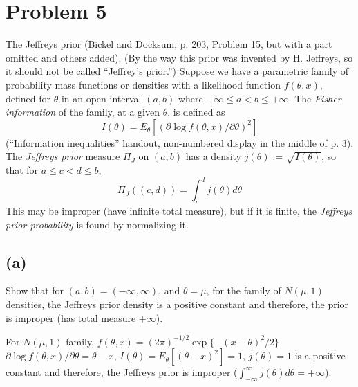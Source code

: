 \documentclass[11pt]{article}
\newcommand{\ProbS}{\iftrue}
\newcommand{\ProbE}{\fi}
\begin{document}
\section{Problem 5}
\ProbS
The Jeffreys prior (Bickel and Docksum, p. 203, Problem 15, but with a part omitted and others added). (By the way this prior was invented by H. Jeffreys, so it should not be called ``Jeffrey's prior.'')
Suppose we have a parametric family of probability mass functions or densities with a likelihood function $f(\theta, x)$, defined for $\theta$ in an open interval $(a,b)$ where $-\infty \leq a < b \leq +\infty$.
The \emph{Fisher information} of the family, at a given $\theta$, is defined as
$$
I(\theta) = E_{\theta}[(\partial \log f(\theta, x) / \partial \theta)^2]
$$
(``Information inequalities'' handout, non-numbered display in the middle of p. 3). The \emph{Jeffreys prior} measure $\Pi_{J}$ on $(a,b)$ has a density
$
j(\theta) := \sqrt{I(\theta)}
$, so that for
$a \leq c < d \leq b$,
$$
\Pi_{J}((c,d)) = \int_{c}^{d} j(\theta) d\theta
$$
This may be improper (have infinite total measure), but if it is finite, the \emph{Jeffreys prior probability} is found by normalizing it.
\ProbE

\subsection*{(a)}
\ProbS
Show that for $(a,b) = (-\infty, \infty)$, and $\theta = \mu$, for the family of $N(\mu, 1)$ densities, the Jeffreys prior density is a positive constant and therefore, the prior is improper (has total measure $+\infty$).
\ProbE

For $N(\mu, 1)$ family,
$
f(\theta, x) =
(2\pi)^{-1/2}\exp\{{-(x-\theta)^2}/{2}\}
$
\\
$
\partial \log f(\theta, x) / \partial\theta = \theta-x
$,
$
I(\theta) = E_\theta[(\theta-x)^2] = 1
$,
$
j(\theta) = 1
$
is a positive constant and therefore, the Jeffreys prior is improper
($
\int_{-\infty}^{\infty} j(\theta) d\theta = +\infty
$).
\end{document}
